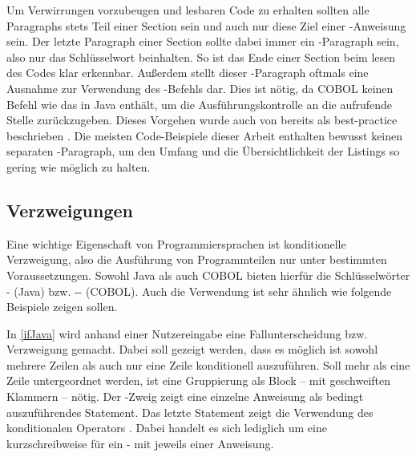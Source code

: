 Um Verwirrungen vorzubeugen und lesbaren Code zu erhalten sollten alle Paragraphs stets Teil einer Section sein und auch nur diese Ziel einer -Anweisung sein. Der letzte Paragraph einer Section sollte dabei immer ein -Paragraph sein, also nur das Schlüsselwort  beinhalten. So ist das Ende einer Section beim lesen des Codes klar erkennbar. Außerdem stellt dieser -Paragraph oftmals eine Ausnahme zur Verwendung des -Befehls dar. Dies ist nötig, da COBOL keinen Befehl wie das  in Java enthält, um die Ausführungskontrolle an die aufrufende Stelle zurückzugeben. Dieses Vorgehen wurde auch von \citeauthor{richards_enhancing_1984} bereits \citeyear{richards_enhancing_1984} als best-practice beschrieben  \cite{richards_enhancing_1984}. Die meisten Code-Beispiele dieser Arbeit enthalten bewusst keinen separaten -Paragraph, um den Umfang und die Übersichtlichkeit der Listings so gering wie möglich zu halten. 

\subsection{Verzweigungen}
Eine wichtige Eigenschaft von Programmiersprachen ist konditionelle Verzweigung, also die Ausführung von Programmteilen nur unter bestimmten Voraussetzungen. Sowohl Java als auch COBOL bieten hierfür die Schlüsselwörter - (Java) bzw. -- (COBOL). Auch die Verwendung ist sehr ähnlich wie folgende Beispiele zeigen sollen.


In \autoref{ifJava} wird anhand einer Nutzereingabe eine Fallunterscheidung bzw. Verzweigung gemacht. Dabei soll gezeigt werden, dass es möglich ist sowohl mehrere Zeilen als auch nur eine Zeile konditionell auszuführen. Soll mehr als eine Zeile untergeordnet werden, ist eine Gruppierung als Block -- mit geschweiften Klammern -- nötig. Der -Zweig zeigt eine einzelne Anweisung als bedingt auszuführendes Statement. Das letzte Statement zeigt die Verwendung des konditionalen Operators . Dabei handelt es sich lediglich um eine kurzschreibweise für ein - mit jeweils einer Anweisung. 


